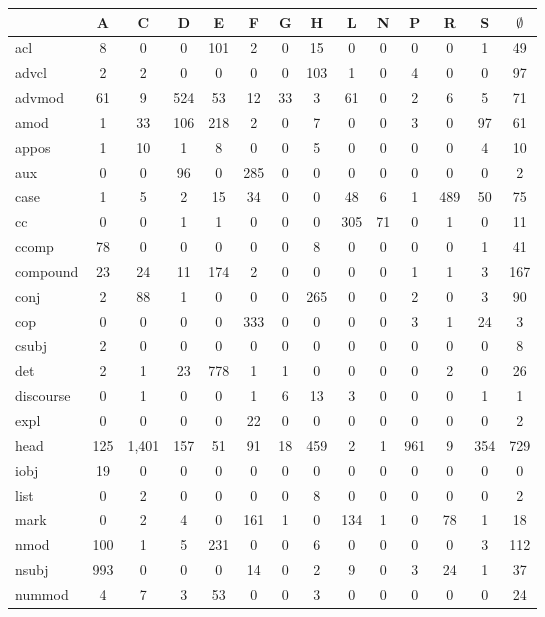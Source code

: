 \documentclass[11pt,a4paper]{article}
\begin{document}
\begin{table}[t]
\centering
\scriptsize
\setlength\tabcolsep{2pt}
\begin{tabular}{l|ccccccccccccc}
 & A & C & D & E & F & G & H & L & N & P & R & S & $\emptyset$ \\
\hline
acl & 8 & 0 & 0 & 101 & 2 & 0 & 15 & 0 & 0 & 0 & 0 & 1 & 49 \\
advcl & 2 & 2 & 0 & 0 & 0 & 0 & 103 & 1 & 0 & 4 & 0 & 0 & 97 \\
advmod & 61 & 9 & 524 & 53 & 12 & 33 & 3 & 61 & 0 & 2 & 6 & 5 & 71 \\
amod & 1 & 33 & 106 & 218 & 2 & 0 & 7 & 0 & 0 & 3 & 0 & 97 & 61 \\
appos & 1 & 10 & 1 & 8 & 0 & 0 & 5 & 0 & 0 & 0 & 0 & 4 & 10 \\
aux & 0 & 0 & 96 & 0 & 285 & 0 & 0 & 0 & 0 & 0 & 0 & 0 & 2 \\
case & 1 & 5 & 2 & 15 & 34 & 0 & 0 & 48 & 6 & 1 & 489 & 50 & 75 \\
cc & 0 & 0 & 1 & 1 & 0 & 0 & 0 & 305 & 71 & 0 & 1 & 0 & 11 \\
ccomp & 78 & 0 & 0 & 0 & 0 & 0 & 8 & 0 & 0 & 0 & 0 & 1 & 41 \\
compound & 23 & 24 & 11 & 174 & 2 & 0 & 0 & 0 & 0 & 1 & 1 & 3 & 167 \\
conj & 2 & 88 & 1 & 0 & 0 & 0 & 265 & 0 & 0 & 2 & 0 & 3 & 90 \\
cop & 0 & 0 & 0 & 0 & 333 & 0 & 0 & 0 & 0 & 3 & 1 & 24 & 3 \\
csubj & 2 & 0 & 0 & 0 & 0 & 0 & 0 & 0 & 0 & 0 & 0 & 0 & 8 \\
det & 2 & 1 & 23 & 778 & 1 & 1 & 0 & 0 & 0 & 0 & 2 & 0 & 26 \\
discourse & 0 & 1 & 0 & 0 & 1 & 6 & 13 & 3 & 0 & 0 & 0 & 1 & 1 \\
expl & 0 & 0 & 0 & 0 & 22 & 0 & 0 & 0 & 0 & 0 & 0 & 0 & 2 \\
head & 125 & 1,401 & 157 & 51 & 91 & 18 & 459 & 2 & 1 & 961 & 9 & 354 & 729 \\
iobj & 19 & 0 & 0 & 0 & 0 & 0 & 0 & 0 & 0 & 0 & 0 & 0 & 0 \\
list & 0 & 2 & 0 & 0 & 0 & 0 & 8 & 0 & 0 & 0 & 0 & 0 & 2 \\
mark & 0 & 2 & 4 & 0 & 161 & 1 & 0 & 134 & 1 & 0 & 78 & 1 & 18 \\
nmod & 100 & 1 & 5 & 231 & 0 & 0 & 6 & 0 & 0 & 0 & 0 & 3 & 112 \\
nsubj & 993 & 0 & 0 & 0 & 14 & 0 & 2 & 9 & 0 & 3 & 24 & 1 & 37 \\
nummod & 4 & 7 & 3 & 53 & 0 & 0 & 3 & 0 & 0 & 0 & 0 & 0 & 24 \\

\end{tabular}
\end{table}
\end{document}
